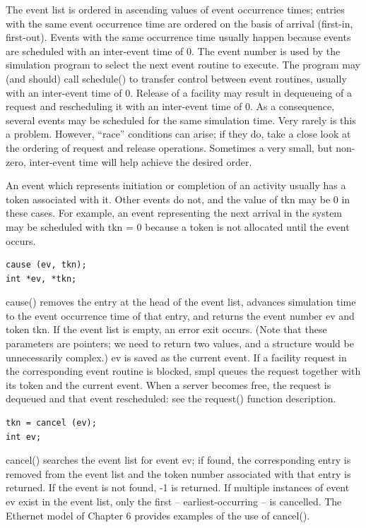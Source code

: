 The event list is ordered in ascending values of event occurrence times;
entries with the same event occurrence time are ordered on the basis of
arrival (first-in, first-out). Events with the same occurrence time usually
happen because events are scheduled with an inter-event time of 0. The event
number is used by the simulation program to select the next event routine to
execute. The program may (and should) call schedule() to transfer control
between event routines, usually with an inter-event time of 0. Release of a
facility may result in dequeueing of a request and rescheduling it with an
inter-event time of 0. As a consequence, several events may be scheduled for
the same simulation time. Very rarely is this a problem. However, ``race''
conditions can arise; if they do, take a close look at the ordering of request
and release operations. Sometimes a very small, but non-zero, inter-event time
will help achieve the desired order.

An event which represents initiation or completion of an activity usually has
a token associated with it. Other events do not, and the value of tkn may be 0
in these cases. For example, an event representing the next arrival in the
system may be scheduled with tkn = 0 because a token is not allocated until
the event occurs.

\begin{verbatim}
cause (ev, tkn);
int *ev, *tkn;
\end{verbatim}

cause() removes the entry at the head of the event list, advances simulation
time to the event occurrence time of that entry, and returns the event number
ev and token tkn. If the event list is empty, an error exit occurs. (Note that
these parameters are pointers; we need to return two values, and a structure
would be unnecessarily complex.) ev is saved as the current event. If a
facility request in the corresponding event routine is blocked, smpl queues
the request together with its token and the current event. When a server
becomes free, the request is dequeued and that event rescheduled: see the
request() function description.

\begin{verbatim}
tkn = cancel (ev);
int ev;
\end{verbatim}

cancel() searches the event list for event ev; if found, the corresponding
entry is removed from the event list and the token number associated with that
entry is returned. If the event is not found, -1 is returned. If multiple
instances of event ev exist in the event list, only the first --
earliest-occurring -- is cancelled. The Ethernet model of Chapter 6 provides
examples of the use of cancel().

